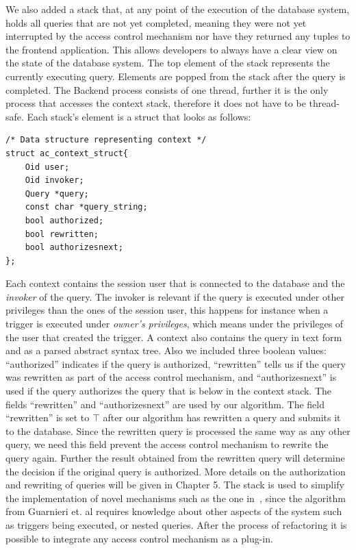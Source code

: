 We also added a stack that, at any point of the execution of the database system, holds all queries that are not yet completed, meaning they were not yet interrupted by the access control mechanism nor have they returned any tuples to the frontend application.
%
This allows developers to always have a clear view on the state of the database system.
%
The top element of the stack represents the currently executing query.
%
Elements are popped from the stack after the query is completed.
%
The Backend process consists of one thread, further it is the only process that accesses the context stack, therefore it does not have to be thread-safe.
% 
Each stack's element is a struct that looks as follows:
%
\begin{lstlisting}[frame=single, style=customc]
/* Data structure representing context */
struct ac_context_struct{
	Oid user;
	Oid invoker;
	Query *query;
	const char *query_string;
	bool authorized;
	bool rewritten;
	bool authorizesnext;
};
\end{lstlisting}
%
Each context contains the session user that is connected to the database and the \emph{invoker} of the query.
%
The invoker is relevant if the query is executed under other privileges than the ones of the session user, this happens for instance when a trigger is executed under \emph{owner's privileges}, which means under the privileges of the user that created the trigger.
%
A context also contains the query in text form and as a parsed abstract syntax tree.
%
Also we included three boolean values: ``authorized'' indicates if the query is authorized, ``rewritten'' tells us if the query was rewritten as part of the access control mechanism, and ``authorizesnext'' is used if the query authorizes the query that is below in the context stack. 
%
The fields ``rewritten'' and ``authorizesnext'' are used by our algorithm.
%
The field ``rewritten'' is set to $\top$ after our algorithm has rewritten a query and submits it to the database. 
%
Since the rewritten query is processed the same way as any other query, we need this field prevent the access control mechanism to rewrite the query again.
%
Further the result obtained from the rewritten query will determine the decision if the original query is authorized.
%
More details on the authorization and rewriting of queries will be given in Chapter 5.
%
The stack is used to simplify the implementation of novel mechanisms such as the one in~\cite{guarnieri2016strong}, since the algorithm from Guarnieri et. al requires knowledge about other aspects of the system such as triggers being executed, or nested queries.
%
After the process of refactoring it is possible to integrate any access control mechanism as a plug-in.